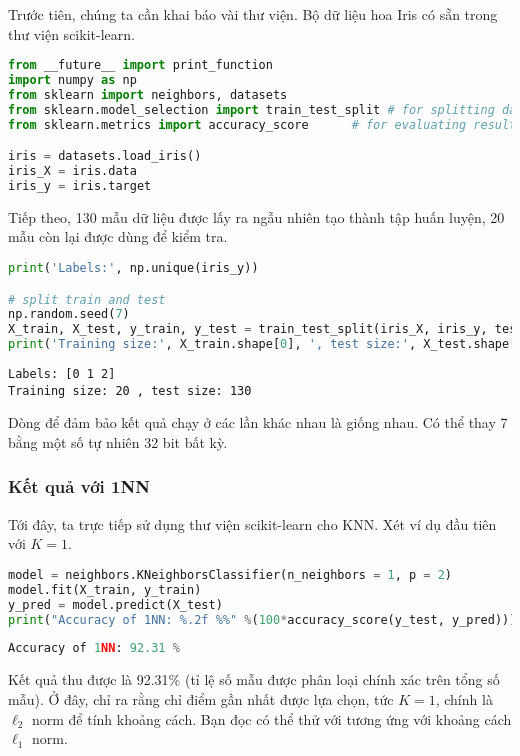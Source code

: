 Trước tiên, chúng ta cần khai báo vài thư viện. Bộ dữ liệu hoa Iris có sẵn trong
thư viện scikit-learn.

\begin{lstlisting}[language=Python]
from __future__ import print_function 
import numpy as np
from sklearn import neighbors, datasets
from sklearn.model_selection import train_test_split # for splitting data 
from sklearn.metrics import accuracy_score      # for evaluating results

iris = datasets.load_iris()
iris_X = iris.data
iris_y = iris.target
\end{lstlisting}

Tiếp theo, 130 mẫu dữ liệu được lấy ra ngẫu nhiên tạo thành tập huấn luyện, 20 mẫu còn lại được dùng để kiểm tra.

\begin{lstlisting}[language=Python]
print('Labels:', np.unique(iris_y))

# split train and test 
np.random.seed(7) 
X_train, X_test, y_train, y_test = train_test_split(iris_X, iris_y, test_size=130)
print('Training size:', X_train.shape[0], ', test size:', X_test.shape[0])
\end{lstlisting}
\begin{lstlisting}
Labels: [0 1 2]
Training size: 20 , test size: 130
\end{lstlisting}

Dòng  để đảm bảo kết quả chạy ở các lần khác nhau là giống nhau. Có thể thay 7 bằng một số tự
nhiên 32 bit bất kỳ. 

\subsubsection{Kết quả với 1NN}
Tới đây, ta trực tiếp sử dụng thư viện scikit-learn cho KNN. Xét ví dụ đầu tiên
với $K = 1$.

\begin{lstlisting}[language=Python]
model = neighbors.KNeighborsClassifier(n_neighbors = 1, p = 2)
model.fit(X_train, y_train)
y_pred = model.predict(X_test)
print("Accuracy of 1NN: %.2f %%" %(100*accuracy_score(y_test, y_pred)))
\end{lstlisting}
\kq
\begin{lstlisting}[language=Python]
Accuracy of 1NN: 92.31 %
\end{lstlisting}

Kết quả thu được là 92.31\% (tỉ lệ số mẫu được phân loại chính xác trên tổng số
mẫu). Ở đây,  chỉ ra rằng chỉ điểm gần nhất được
lựa chọn, tức $K = 1$,  chính là $\ell_2$ norm để tính
khoảng cách. Bạn đọc có thể thử với  tương ứng với khoảng
cách $\ell_1$ norm.





